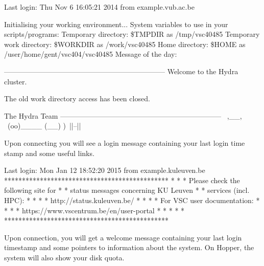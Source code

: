 \begin{prompt}
Last login: Thu Nov  6 16:05:21 2014 from example.vub.ac.be

Initialising your working environment...
System variables to use in your scripts/programs:
  Temporary directory:   \$TMPDIR as /tmp/vsc40485
  Temporary work directory:    \$WORKDIR as /work/vsc40485
  Home directory:              \$HOME as /user/home/gent/vsc404/vsc40485
Message of the day:

  --------------------------------------------------------------------
  Welcome to the Hydra cluster.

  The old work directory access has been closed.


  The Hydra Team
  --------------------------------------------------------------------
       \   ,__,
        \  (oo)____
           (__)    )\
              ||--||

\end{prompt}
\fi %

\ifleuven
Upon connecting you will see a login message containing your last login
time stamp and some useful links.

\begin{prompt}
Last login: Mon Jan 12 18:52:20 2015 from example.kuleuven.be
**********************************************
*                                            *
* Please check the following site for        *
* status messages concerning KU Leuven       *
* services (incl. HPC):                      *
*                                            *
*   http://status.kuleuven.be/               *
*                                            *
* For VSC user documentation:                *
*                                            *
*  https://www.vscentrum.be/en/user-portal   *
*                                            *
*                                            *
**********************************************
\end{prompt}
\fi  %

\ifantwerpen
Upon connection, you will get a welcome message containing your last login
timestamp and some pointers to information about the system. On Hopper, the system
will also show your disk quota.


